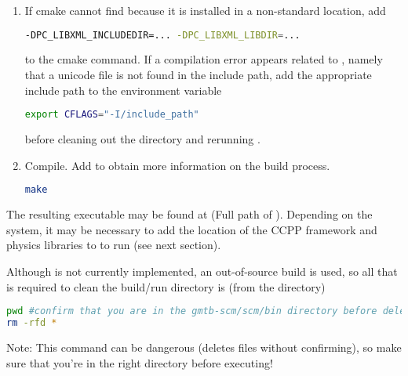 \begin{enumerate}
If necessary, the CCPP prebuild script can be executed manually from the top level directory (). The basic syntax for the dynamic mode is
\begin{lstlisting}[language=bash]
./ccpp/framework/scripts/ccpp_prebuild.py --config=./ccpp/config/ccpp_prebuild_config.py --builddir=./scm/bin [--debug]
\end{lstlisting}
To use the static mode, the syntax becomes
\begin{lstlisting}[language=bash]
./ccpp/framework/scripts/ccpp_prebuild.py --config=./ccpp/config/ccpp_prebuild_config.py --static --suites=SCM_GFS_v15p2,SCM_GFS_v16beta,SCM_GSD_v1[...] --builddir=./scm/bin [--debug]
\end{lstlisting}
where the argument supplied via the  variable is a comma-separated list of suite names that exist in the  directory. Note that suite names are the suite definition filenames minus the  prefix and  suffix.
   
       \item If cmake cannot find  because it is installed in a non-standard location, add
\begin{lstlisting}[language=bash]
-DPC_LIBXML_INCLUDEDIR=... -DPC_LIBXML_LIBDIR=...
\end{lstlisting}
    to the cmake command. If a compilation error appears related to , namely that a unicode file is not found in the include path, add the appropriate include path to the  environment variable
\begin{lstlisting}[language=bash]
export CFLAGS="-I/include_path"
\end{lstlisting} before cleaning out the  directory and rerunning .
    \item Compile. Add  to obtain more information on the build process.
\begin{lstlisting}[language=bash]
make
\end{lstlisting}
\end{enumerate}

The resulting executable may be found at  (Full path of ). Depending on the system, it may be necessary to add the location of the CCPP framework and physics libraries to  to run  (see next section).

Although  is not currently implemented, an out-of-source build is used, so all that is required to clean the build/run directory is (from the  directory)
\begin{lstlisting}[language=bash]
pwd #confirm that you are in the gmtb-scm/scm/bin directory before deleting files
rm -rfd *
\end{lstlisting}
Note: This command can be dangerous (deletes files without confirming), so make sure that you're in the right directory before executing!


